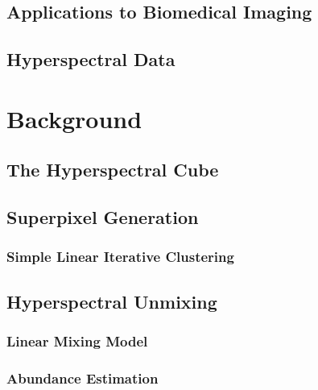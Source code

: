 \documentclass[10pt]{article}
\begin{document}
\subsection{Applications to Biomedical Imaging}
\subsection{Hyperspectral Data}

\clearpage
% 
% 
% 
% 
% 
\section{Background} \label{Background}

% 
\subsection{The Hyperspectral Cube} \label{Cube}


\subsection{Superpixel Generation} \label{Superpixel}

\subsubsection{Simple Linear Iterative Clustering} \label{SLIC}


\subsection{Hyperspectral Unmixing} \label{Unmixing Intro}

\subsubsection{Linear Mixing Model}\label{LMM}

\subsubsection{Abundance Estimation}\label{AE}

\end{document}
